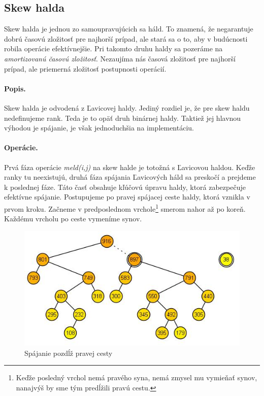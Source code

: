 \subsection{Skew halda} 
Skew halda je jednou zo samoupravujúcich sa háld. To znamená, že negarantuje dobrú časovú zložitosť pre najhorší prípad, ale stará 
sa o to, aby v budúcnosti robila operácie efektívnejšie. Pri takomto druhu haldy sa pozeráme na \emph{amortizovanú časovú 
zložitosť}. Nezaujíma nás časová zložitosť pre najhorší prípad, ale priemerná zložitosť postupnosti operácií.

\paragraph{Popis.}
Skew halda je odvodená z Ľavicovej haldy. Jediný rozdiel je, že pre skew haldu nedefinujeme rank. Teda je to opäť druh binárnej 
haldy. Taktiež jej hlavnou výhodou je spájanie, je však jednoduchšia na implementáciu.


\paragraph{Operácie.}
Prvá fáza operácie \emph{meld(i,j)} na skew halde je totožná s Ľavicovou haldou. Keďže ranky tu neexistujú, druhá fáza spájania 
Ľavicových háld sa preskočí a prejdeme k poslednej fáze. Táto časť obsahuje kľúčovú úpravu haldy, ktorá zabezpečuje efektívne 
spájanie. Postupujeme po pravej spájacej ceste haldy, ktorá vznikla v prvom kroku. Začneme v predposlednom vrchole\footnote{Keďže posledný vrchol nemá pravého syna, nemá zmysel mu vymieňať synov, nanajvýš by sme tým predĺžili pravú cestu.} smerom nahor až po koreň. Každému vrcholu po ceste vymeníme synov.


\begin{figure}
\includegraphics[width=\columnwidth]{obrazky/skewinsert.png}
\caption{\emph{} 
Spájanie pozdĺž pravej cesty} 
\label{img:skew} 
\end{figure}

